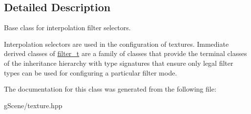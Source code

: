 \subsection{Detailed Description}
Base class for interpolation filter selectors. 

Interpolation selectors are used in the configuration of textures. Immediate derived classes of \hyperlink{classgfx_1_1filter__t}{filter\-\_\-t} are a family of classes that provide the terminal classes of the inheritance hierarchy with type signatures that ensure only legal filter types can be used for configuring a particular filter mode. 

The documentation for this class was generated from the following file\-:\begin{DoxyCompactItemize}
\item 
g\-Scene/texture.\-hpp\end{DoxyCompactItemize}
